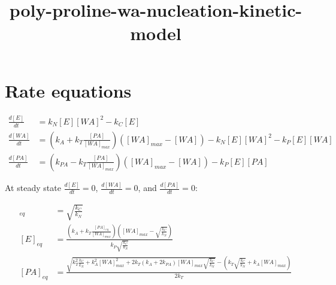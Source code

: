 \documentclass[11pt]{article}
\title{poly-proline-wa-nucleation-kinetic-model}
\begin{document}
    
    
    \maketitle
    
    

    
    \hypertarget{rate-equations}{%
\section{Rate equations}\label{rate-equations}}

\begin{align}
\frac{d[E]}{dt} &= k_N [E] [WA]^2 - k_C [E] \\
\frac{d[WA]}{dt} &= (k_A + k_T \frac{[PA]}{[WA]_{max}}) ([WA]_{max} - [WA]) - k_N [E][WA]^2 - k_P [E][WA] \\
\frac{d[PA]}{dt} &= (k_{PA} - k_T \frac{[PA]}{[WA]_{max}})([WA]_{max} - [WA]) - k_P [E][PA]
\end{align}

At steady state \(\frac{d[E]}{dt} = 0\), \(\frac{d[WA]}{dt} = 0\), and
\(\frac{d[PA]}{dt} = 0\):

\begin{align}
[WA]_{eq} &= \sqrt{\frac{k_C}{k_N}} \\
[E]_{eq} &= \frac{(k_A + k_T \frac{[PA]_{eq}}{[WA]_{max}})([WA]_{max} - \sqrt{\frac{k_C}{k_N}})}{k_P \sqrt{\frac{k_C}{k_N}}} \\
[PA]_{eq} &= \frac{\sqrt{k_T^2 \frac{k_C}{k_N} + k_A^2 [WA]_{max}^2 + 2 k_T (k_A + 2 k_{PA})[WA]_{max} \sqrt{\frac{k_C}{k_N}}} - (k_T \sqrt{\frac{k_C}{k_N}} + k_A[WA]_{max})}{2 k_T}
\end{align}
\end{document}
